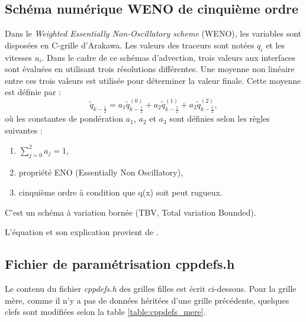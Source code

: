 \documentclass[10pt,a4paper,titlepage]{article}
\begin{document}
\subsection{Schéma numérique WENO de cinquième ordre}
\label{anx:WENO}
Dans le \textit{Weighted Essentially Non-Oscillatory scheme} (WENO), les variables sont disposées en C-grille d'Arakawa.
Les valeurs des traceurs sont notées $q_i$ et les vitesses $u_i$.
Dans le cadre de ce schémas d'advection, trois valeurs aux interfaces sont évaluées en utilisant trois résolutions différentes.
Une moyenne non linéaire entre ces trois valeurs est utilisée pour déterminer la valeur finale.
Cette moyenne est définie par :
$$\tilde{q}_{k-\frac{1}{2}} = a_1\tilde{q}^{(0)}_{k-\frac{1}{2}} + a_2\tilde{q}^{(1)}_{k-\frac{1}{2}} + a_2\tilde{q}^{(2)}_{k-\frac{1}{2}},$$
où les constantes de pondération $a_1$, $a_2$ et $a_3$ sont définies selon les règles suivantes :
\begin{enumerate}
    \item $\sum_{j=0}^{2}a_j = 1$,
    \item propriété ENO (Essentially Non Oscillatory),
    \item cinquième ordre à condition que q(x) soit peut rugueux.
\end{enumerate}
C'est un schéma à variation bornée (TBV, Total variation Bounded).

L'équation et son explication provient de \cite{schemas_advection}.


\subsection{Fichier de paramétrisation cppdefs.h}
\label{anx:cppdefs}
Le contenu du fichier \textit{cppdefs.h} des grilles filles est écrit ci-dessous. Pour la grille mère, comme il n'y a pas de données héritées d'une grille précédente, quelques clefs sont modifiées selon la table \ref{table:cppdefs_mere}.
\end{document}
